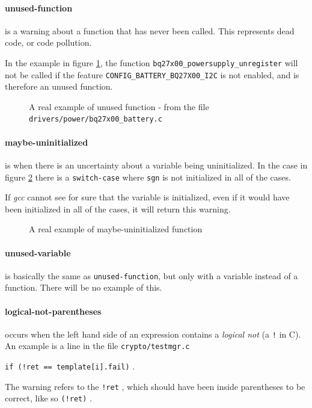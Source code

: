 \documentclass[a4paper,11pt]{report}
\newcommand{\textcode}[1]{
    \fboxsep=1pt
    \texttt{\colorbox{gray!20}{#1}}
}
\newcommand{\figa}{
    \begin{figure}[!htpb]
    \centering
}
\newcommand{\figb}[2]{
    \caption{#1}
    \label{#2}
    \end{figure}
}
\begin{document}
    \paragraph{unused-function}

is a warning about a function that has never been called. This represents dead 
code, or code pollution. 

In the example in figure \ref{lst:unusedfuncreal}, the function 
\texttt{bq27x00\_powersupply\_unregister} will not be called if the feature 
\texttt{CONFIG\_BATTERY\_BQ27X00\_I2C} is not enabled, and is therefore an 
unused function.

\figa
    
\figb{A real example of unused function - from the file 
    \texttt{drivers/power/bq27x00\_battery.c}}{lst:unusedfuncreal}


    \paragraph{maybe-uninitialized}
is when there is an uncertainty about a variable being uninitialized. In the 
case in figure \ref{lst:maybeuninitializedreal} there is a 
\texttt{switch-case} where \texttt{sgn} is not initialized in all of the cases.

If \emph{gcc} cannot see for sure that the variable is initialized, 
even if it would have been initialized in all of the cases, it will return this 
warning.

\figa
    
\figb{A real example of maybe-uninitialized function}{lst:maybeuninitializedreal}


    \paragraph{unused-variable}
is basically the same as \texttt{unused-function}, but only with a variable 
instead of a function. There will be no example of this.


    \paragraph{logical-not-parentheses}
occurs when the left hand side of an expression contains a \emph{logical not} 
(a \texttt{!} in C). An example is a line in the file \texttt{crypto/testmgr.c}
\textcode{if (!ret == template[i].fail)}.

The warning refers to the \textcode{!ret}, which should have been inside 
parentheses to be correct, like so \textcode{(!ret)}.
\end{document}
